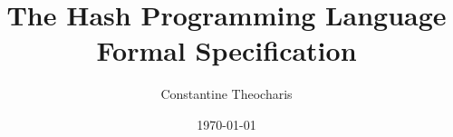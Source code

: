 


\title{The Hash Programming Language \\ {\Large Formal Specification}}
\author{
  \begin{tabular}{rl}
    Constantine Theocharis
  \end{tabular}
}
\date{\today}
\maketitle




